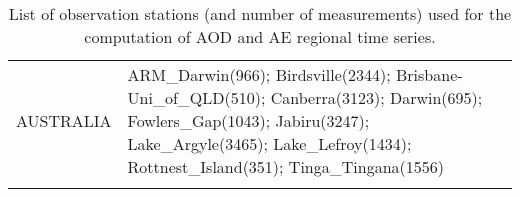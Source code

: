 \documentclass[journal abbreviation, manuscript]{copernicus}
\begin{document}
\begin{table}
\begin{tabularx}{\textwidth}{lX}
 AUSTRALIA &                                                                                                                                                                                                                                                                                                                                                                                                                                                                                                                                                                                                                                                                                                                                                                                                                                                                                                                                                                                                                                                                                                                                                                                                                                                                                                                                                                                                                                                                                                                                                                                                                                                                                                                                                                                                                                                                                                                                                                                                                                                                        ARM\_Darwin(966); Birdsville(2344); Brisbane-Uni\_of\_QLD(510); Canberra(3123); Darwin(695); Fowlers\_Gap(1043); Jabiru(3247); Lake\_Argyle(3465); Lake\_Lefroy(1434); Rottnest\_Island(351); Tinga\_Tingana(1556) \\
\bottomhline
 \end{tabularx}
 \caption{List of observation stations (and number of measurements) used for the computation of AOD and AE regional time series.}
 \label{table:stations_aerosun}
\end{table}

\clearpage
\end{document}
